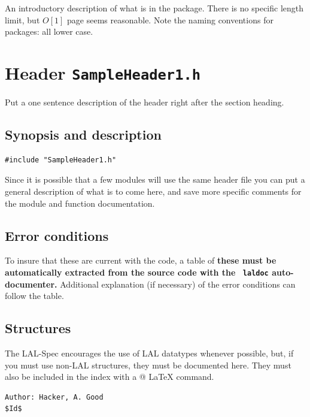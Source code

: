 \documentclass[oneside]{book}
\begin{document}
An introductory description of what is in the package.
There is no specific length limit, but $O[1]$ page seems
reasonable. Note the naming conventions for packages: all lower case.


\newpage

\section{Header {\texttt {SampleHeader1.h}}}
Put a one sentence description of the header right after the section
heading.

\subsection*{Synopsis and description}

\begin{verbatim}
#include "SampleHeader1.h"
\end{verbatim}
Since it is possible that a few modules will use the same header file
you can put a general description of what is to come here, and save
more specific comments for the module and function documentation.

\subsection*{Error conditions}
To insure that these are current with the code, a table of {\bf these
must be automatically extracted from the source code with the {\tt
laldoc} auto-documenter.} Additional explanation (if necessary) of the
error conditions can follow the table.

\subsection*{Structures}

The LAL-Spec encourages the use of LAL datatypes whenever possible,
but, if you must use  non-LAL structures, they must be documented
here.  They must also be included in the index with a
\verb@{}@ {\LaTeX} command.

\vfill{
\footnotesize{
\vspace{-1ex}
\mbox{}
\vspace{-3ex}
\begin{verbatim}
Author: Hacker, A. Good
$Id$
\end{verbatim}
}
}
\end{document}
